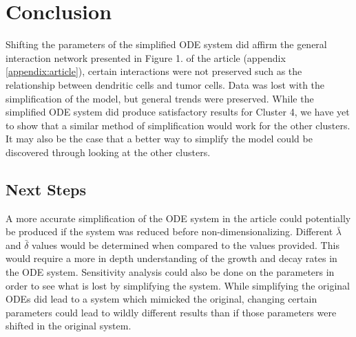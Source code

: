 \documentclass{article}
\begin{document}
\section{Conclusion}
Shifting the parameters of the simplified ODE system did affirm the general interaction network presented in Figure 1. of the article (appendix \ref{appendix:article}), certain interactions were not preserved such as the relationship between dendritic cells and tumor cells. Data was lost with the simplification of the model, but general trends were preserved. While the simplified ODE system did produce satisfactory results for Cluster 4, we have yet to show that a similar method of simplification would work for the other clusters. It may also be the case that a better way to simplify the model could be discovered through looking at the other clusters.

\subsection{Next Steps}
A more accurate simplification of the ODE system in the article could potentially be produced if the system was reduced before non-dimensionalizing. Different $\bar{\lambda}$ and $\bar{\delta}$ values would be determined when compared to the values provided. This would require a more in depth understanding of the growth and decay rates in the ODE system. Sensitivity analysis could also be done on the parameters in order to see what is lost by simplifying the system. While simplifying the original ODEs did lead to a system which mimicked the original, changing certain parameters could lead to wildly different results than if those parameters were shifted in the original system. 
\newpage
\appendix 
\end{document}
